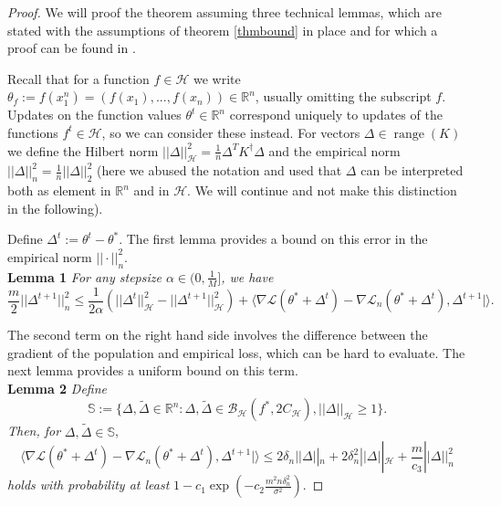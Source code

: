 \begin{proof}
We will proof the theorem assuming three technical lemmas, which are stated with the assumptions of theorem \ref{thmbound} in place and for which a proof can be found in \cite{wain17ada}.

Recall that for a function $f\in \mathcal{H}$ we write $\theta_f := f(x_1^n) = (f(x_1),...,f(x_n))\in \mathbb{R}^n$, usually omitting the subscript $f$. Updates on the function values $\theta^t\in \mathbb{R}^n$ correspond uniquely to updates of the functions $f^t\in\mathcal{H}$, so we can consider these instead. For vectors $\Delta\in \operatorname{range}(K)$ we define the Hilbert norm $||\Delta||_{\mathcal{H}}^2 = \frac{1}{n}\Delta^TK^{\dagger}\Delta$ and the empirical norm $||\Delta||_n^2 = \frac{1}{n}||\Delta||_2^2$ (here we abused the notation and used that $\Delta$ can be interpreted both as element in $\mathbb{R}^n$ and in $\mathcal{H}$. We will continue and not make this distinction in the following).

Define $\Delta^t := \theta^t-\theta^*$. The first lemma provides a bound on this error in the empirical norm $||\cdot||_n^2$.\\
\textbf{Lemma 1}
\textit{For any stepsize $\alpha\in(0,\frac{1}{M}]$, we have}
\begin{equation}
\label{lemma1eq}
\frac{m}{2}||\Delta^{t+1}||_n^2\le \frac{1}{2\alpha}(||\Delta^t||_{\mathcal{H}}^2 - ||\Delta^{t+1}||_{\mathcal{H}}^2) + \langle\nabla\mathcal{L}(\theta^*+\Delta^t) - \nabla\mathcal{L}_n(\theta^*+\Delta^t), \Delta^{t+1}|\rangle.
\end{equation}

The second term on the right hand side involves the difference between the gradient of the population and empirical loss, which can be hard to evaluate. The next lemma provides a uniform bound on this term. \\
\textbf{Lemma 2}
\textit{Define}
\begin{equation*}
\mathbb{S} := \{\Delta, \tilde{\Delta}\in \mathbb{R}^n: \Delta,\tilde{\Delta}\in \mathcal{B}_{\mathcal{H}}(f^*,2C_{\mathcal{H}}), ||\Delta||_{\mathcal{H}} \geq 1 \}.
\end{equation*}
\textit{Then, for} $\Delta, \tilde{\Delta} \in \mathbb{S}$,
\begin{equation}
\label{lemma2eq}
\langle\nabla\mathcal{L}(\theta^*+\Delta^t) - \nabla\mathcal{L}_n(\theta^*+\Delta^t), \Delta^{t+1}|\rangle \le 2\delta_n||\Delta||_n + 2\delta_n^2||\Delta||_{\mathcal{H}} + \frac{m}{c_3}||\Delta||_n^2
\end{equation}
\textit{holds with probability at least} $1-c_1\exp(-c_2\frac{m^2n\delta_n^2}{\sigma^2})$.


\end{proof}
